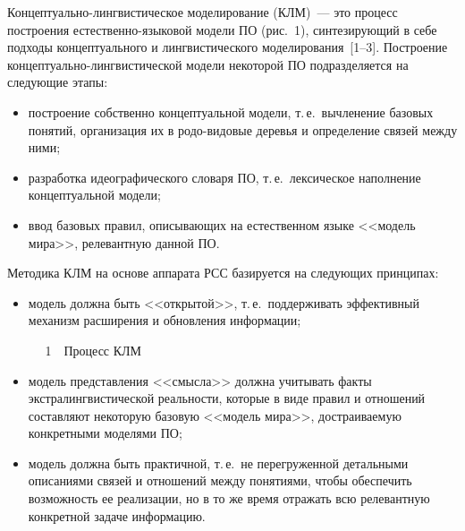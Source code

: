 \begin{multicols}{2}
     Концептуально-лингвистическое моделирование (КЛМ)~--- это 
процесс построения ес\-тест\-вен\-но-язы\-ко\-вой модели ПО (рис.~1), синтезирующий в себе подходы 
концептуального и лингвистического моделирования~[1--3]. 
По\-стро\-ение концептуально-лингвистической модели некоторой 
ПО подразделяется на следующие этапы:
     \begin{itemize}
     \item построение собственно концептуальной модели, т.\,е.\ вычленение 
базовых понятий, организация их в ро\-до-ви\-до\-вые деревья и определение 
связей между ними;
     \item разработка идеографического словаря ПО, т.\,е.\ 
лексическое наполнение концептуальной модели;
     \item ввод базовых правил, описывающих на естественном языке 
<<модель мира>>, релевантную данной ПО.
     \end{itemize}
     
     
     Методика КЛМ на 
основе аппарата РСС базируется на следующих принципах:
     \begin{itemize}
\item модель должна быть <<открытой>>, т.\,е.\ поддерживать эффективный 
механизм расширения и обновления информации;
\begin{center} %
\hspace*{-10.7158pt}\mbox{%
\epsfxsize=77.871mm
}\hspace{10.7158pt}
\vspace*{4pt}
{{\figurename~1}\ \ \small{Процесс КЛМ}}
\end{center}
\vspace*{3pt}

\addtocounter{figure}{1}
\item модель представления <<смысла>> должна учитывать факты 
экстралингвистической реаль\-ности, которые в виде правил и отношений 
составляют некоторую базовую <<модель мира>>, достраиваемую 
конкретными моделями ПО;
\item модель должна быть практичной, т.\,е.\ не перегруженной детальными 
описаниями связей и отношений между понятиями, чтобы обеспечить 
возможность ее реализации, но в то же время отражать всю релевантную 
конкретной задаче информацию.
\end{itemize}


\end{multicols}
